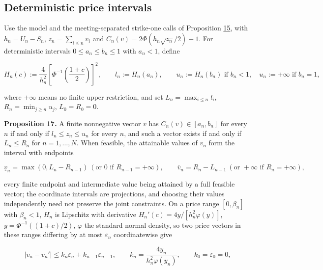 \documentclass[11pt]{article}
\begin{document}
\subsection{Deterministic price intervals}\label{sec:3.15}

Use the model and the meeting-separated strike-one calls of Proposition \hyperref[res:Proposition-15]{15}, with \(h_n = U_n - S_n\), \(z_n = \sum_{i \le n} v_i\) and \(C_n(v) = 2\Phi(h_n \sqrt{z_n} / 2) - 1\). For deterministic intervals \(0 \le a_n \le b_n \le 1\) with \(a_n < 1\), define

\begin{equation*}
H_n(c) := \frac{4}{h_n^2} \left[ \Phi^{-1}\left( \frac{1 + c}{2} \right) \right]^2, \qquad l_n := H_n(a_n), \qquad u_n := H_n(b_n) \text{ if } b_n < 1, \quad u_n := +\infty \text{ if } b_n = 1, \tag{3.67}\label{eq:3.67}
\end{equation*}

where \(+\infty\) means no finite upper restriction, and set \(L_n = \max_{i \le n} l_i\), \(R_n = \min_{j \ge n} u_j\), \(L_0 = R_0 = 0\).

\label{res:Proposition-17}
\textbf{Proposition 17.} A finite nonnegative vector \(v\) has \(C_n(v) \in [a_n, b_n]\) for every \(n\) if and only if \(l_n \le z_n \le u_n\) for every \(n\), and such a vector exists if and only if \(L_n \le R_n\) for \(n = 1, \dots, N\). When feasible, the attainable values of \(v_n\) form the interval with endpoints

\begin{equation*}
\underline v_n = \max(0, L_n - R_{n-1}) \ (\text{or } 0 \text{ if } R_{n-1} = +\infty), \qquad \overline v_n = R_n - L_{n-1} \ (\text{or } +\infty \text{ if } R_n = +\infty), \tag{3.68}\label{eq:3.68}
\end{equation*}

every finite endpoint and intermediate value being attained by a full feasible vector; the coordinate intervals are projections, and choosing their values independently need not preserve the joint constraints. On a price range \([0, \beta_n]\) with \(\beta_n < 1\), \(H_n\) is Lipschitz with derivative \(H_n'(c) = 4y / [h_n^2 \varphi(y)]\), \(y = \Phi^{-1}((1 + c) / 2)\), \(\varphi\) the standard normal density, so two price vectors in these ranges differing by at most \(\varepsilon_n\) coordinatewise give

\begin{equation*}
|v_n - v_n'| \le k_n \varepsilon_n + k_{n-1} \varepsilon_{n-1}, \qquad k_n = \frac{4 y_n}{h_n^2 \varphi(y_n)}, \qquad k_0 = \varepsilon_0 = 0, \tag{3.69}\label{eq:3.69}
\end{equation*}
\end{document}
